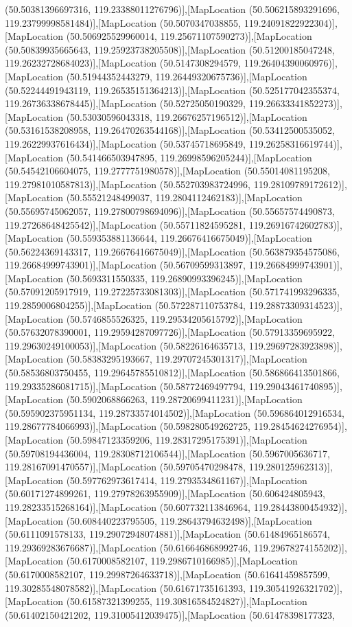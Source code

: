 (50.50381396697316, 119.23388011276796)],[MapLocation (50.506215893291696, 119.23799998581484)],[MapLocation (50.5070347038855, 119.24091822922304)],[MapLocation (50.506925529960014, 119.25671107590273)],[MapLocation (50.50839935665643, 119.25923738205508)],[MapLocation (50.51200185047248, 119.26232728684023)],[MapLocation (50.5147308294579, 119.26404390060976)],[MapLocation (50.51944352443279, 119.26449320675736)],[MapLocation (50.52244491943119, 119.26535151364213)],[MapLocation (50.525177042355374, 119.26736338678445)],[MapLocation (50.52725050190329, 119.26633341852273)],[MapLocation (50.53030596043318, 119.26676257196512)],[MapLocation (50.53161538208958, 119.26470263544168)],[MapLocation (50.53412500535052, 119.26229937616434)],[MapLocation (50.53745718695849, 119.26258316619744)],[MapLocation (50.541466503947895, 119.26998596205244)],[MapLocation (50.54542106604075, 119.2777751980578)],[MapLocation (50.55014081195208, 119.27981010587813)],[MapLocation (50.552703983724996, 119.28109789172612)],[MapLocation (50.55521248499037, 119.2804112462183)],[MapLocation (50.55695745062057, 119.27800798694096)],[MapLocation (50.55657574490873, 119.27268648425542)],[MapLocation (50.55711824595281, 119.26916742602783)],[MapLocation (50.559353881136644, 119.26676416675049)],[MapLocation (50.56224369143317, 119.26676416675049)],[MapLocation (50.563879354575086, 119.26684999743901)],[MapLocation (50.56709599313897, 119.26684999743901)],[MapLocation (50.5693311550335, 119.26890993396245)],[MapLocation (50.57091205917919, 119.27225733081303)],[MapLocation (50.571741993296335, 119.2859006804255)],[MapLocation (50.572287110753784, 119.28873309314523)],[MapLocation (50.5746855526325, 119.29534205615792)],[MapLocation (50.57632078390001, 119.29594287097726)],[MapLocation (50.57913359695922, 119.29630249100053)],[MapLocation (50.58226164635713, 119.29697283923898)],[MapLocation (50.58383295193667, 119.29707245301317)],[MapLocation (50.58536803750455, 119.29645785510812)],[MapLocation (50.586866413501866, 119.29335286081715)],[MapLocation (50.58772469497794, 119.29043461740895)],[MapLocation (50.5902068866263, 119.28720699411231)],[MapLocation (50.595902375951134, 119.28733574014502)],[MapLocation (50.596864012916534, 119.28677784066993)],[MapLocation (50.598280549262725, 119.28454624276954)],[MapLocation (50.59847123359206, 119.28317295175391)],[MapLocation (50.59708194436004, 119.28308712106544)],[MapLocation (50.5967005636717, 119.28167091470557)],[MapLocation (50.59705470298478, 119.280125962313)],[MapLocation (50.597762973617414, 119.2793534861167)],[MapLocation (50.60171274899261, 119.27978263955909)],[MapLocation (50.606424805943, 119.28233515268164)],[MapLocation (50.607732113846964, 119.28443800454932)],[MapLocation (50.608440223795505, 119.28643794632498)],[MapLocation (50.6111091578133, 119.29072948074881)],[MapLocation (50.61484965186574, 119.29369283676687)],[MapLocation (50.616646868992746, 119.29678274155202)],[MapLocation (50.6170008582107, 119.2986710166985)],[MapLocation (50.6170008582107, 119.29987264633718)],[MapLocation (50.61641459857599, 119.30285548078582)],[MapLocation (50.61671735161393, 119.30541926321702)],[MapLocation (50.61587321399255, 119.30816584524827)],[MapLocation (50.61402150421202, 119.31005412039475)],[MapLocation (50.61478398177323, 